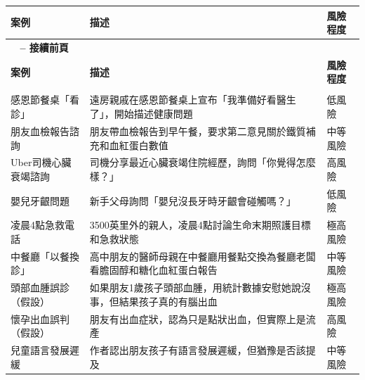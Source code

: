 \documentclass[12pt,a4paper]{article}
\begin{document}
\begin{longtable}{>{\raggedright\arraybackslash}p{3cm} >{\raggedright\arraybackslash}p{7cm} >{\raggedright\arraybackslash}p{5cm}}
\toprule
\textbf{\textcolor{emergency_blue}{案例}} & \textbf{\textcolor{emergency_blue}{描述}} & \textbf{\textcolor{emergency_blue}{風險程度}} \\
\midrule
\endfirsthead

\multicolumn{3}{c}%
{{\bfseries \tablename\ \thetable{} -- 接續前頁}} \\
\toprule
\textbf{\textcolor{emergency_blue}{案例}} & \textbf{\textcolor{emergency_blue}{描述}} & \textbf{\textcolor{emergency_blue}{風險程度}} \\
\midrule
\endhead

\midrule \multicolumn{3}{r}{{接續下頁}} \\ \midrule
\endfoot

\bottomrule
\endlastfoot

感恩節餐桌「看診」 & 遠房親戚在感恩節餐桌上宣布「我準備好看醫生了」，開始描述健康問題 & \textcolor{emergency_gray}{低風險} \\

朋友血檢報告諮詢 & 朋友帶血檢報告到早午餐，要求第二意見關於鐵質補充和血紅蛋白數值 & \textcolor{emergency_gray}{中等風險} \\

Uber司機心臟衰竭諮詢 & 司機分享最近心臟衰竭住院經歷，詢問「你覺得怎麼樣？」 & \textcolor{emergency_red}{高風險} \\

嬰兒牙齦問題 & 新手父母詢問「嬰兒沒長牙時牙齦會碰觸嗎？」 & \textcolor{emergency_gray}{低風險} \\

凌晨4點急救電話 & 3500英里外的親人，凌晨4點討論生命末期照護目標和急救狀態 & \textcolor{emergency_red}{極高風險} \\

中餐廳「以餐換診」 & 高中朋友的醫師母親在中餐廳用餐點交換為餐廳老闆看膽固醇和糖化血紅蛋白報告 & \textcolor{emergency_gray}{中等風險} \\

頭部血腫誤診（假設） & 如果朋友1歲孩子頭部血腫，用統計數據安慰她說沒事，但結果孩子真的有腦出血 & \textcolor{emergency_red}{極高風險} \\

懷孕出血誤判（假設） & 朋友有出血症狀，認為只是點狀出血，但實際上是流產 & \textcolor{emergency_red}{高風險} \\

兒童語言發展遲緩 & 作者認出朋友孩子有語言發展遲緩，但猶豫是否該提及 & \textcolor{emergency_gray}{中等風險} \\
\end{longtable}
\end{document}
